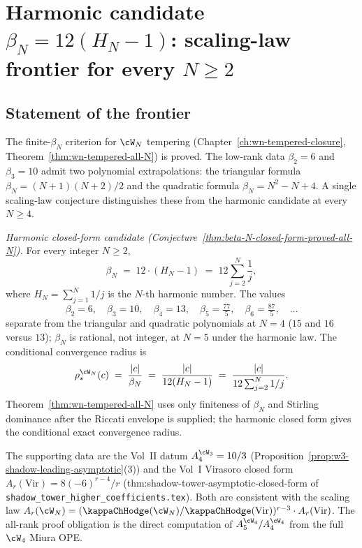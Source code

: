 \chapter{Harmonic candidate $\beta_N = 12(H_N - 1)$: scaling-law frontier
for every $N \ge 2$}
\label{ch:beta-N-closed-form-all}

\section*{Statement of the frontier}

The finite-$\beta_N$ criterion for $\cW_N$ tempering
(Chapter~\ref{ch:wn-tempered-closure},
Theorem~\ref{thm:wn-tempered-all-N}) is proved.
The low-rank data $\beta_2 = 6$ and $\beta_3 = 10$ admit two
polynomial extrapolations: the triangular formula
$\beta_N = (N+1)(N+2)/2$ and the quadratic formula
$\beta_N = N^2 - N + 4$. A single scaling-law conjecture distinguishes
these from the harmonic candidate at every $N \ge 4$.

\emph{Harmonic closed-form candidate
(Conjecture~\ref{thm:beta-N-closed-form-proved-all-N}).} For every
integer $N \ge 2$,
\[
 \beta_N \;=\; 12 \cdot (H_N - 1)
 \;=\; 12 \sum_{j = 2}^{N} \frac{1}{j},
\]
where $H_N = \sum_{j = 1}^{N} 1/j$ is the $N$-th harmonic number.
The values
\[
 \beta_2 = 6, \quad \beta_3 = 10, \quad
 \beta_4 = 13, \quad \beta_5 = \tfrac{77}{5}, \quad
 \beta_6 = \tfrac{87}{5}, \quad \ldots
\]
separate from the triangular and quadratic polynomials at $N = 4$
($15$ and $16$ versus $13$); $\beta_N$ is rational, not integer, at
$N = 5$ under the harmonic law. The conditional convergence radius
is
\[
 \rho_*^{\cW_N}(c)
 \;=\;
 \frac{\lvert c \rvert}{\beta_N}
 \;=\;
 \frac{\lvert c \rvert}{12(H_N - 1)}
 \;=\;
 \frac{\lvert c \rvert}{12 \sum_{j = 2}^{N} 1/j}.
\]
Theorem~\ref{thm:wn-tempered-all-N} uses only finiteness of $\beta_N$
and Stirling dominance after the Riccati envelope is supplied; the
harmonic closed form gives the conditional exact convergence radius.

The supporting data are the Vol~II datum $A_4^{\cW_3} = 10/3$
(Proposition~\ref{prop:w3-shadow-leading-asymptotic}(3)) and the Vol~I
Virasoro closed form $A_r(\mathrm{Vir}) = 8(-6)^{r-4}/r$
(\textsf{thm:shadow-tower-asymptotic-closed-form} of
\texttt{shadow\_tower\_higher\_coefficients.tex}). Both are consistent
with the scaling law
$A_r(\cW_N) = (\kappaChHodge(\cW_N)/\kappaChHodge(\mathrm{Vir}))^{r-3} \cdot
A_r(\mathrm{Vir})$. The all-rank proof obligation is the direct
computation of $A_5^{\cW_4}/A_4^{\cW_4}$ from the full $\cW_4$ Miura
OPE.

